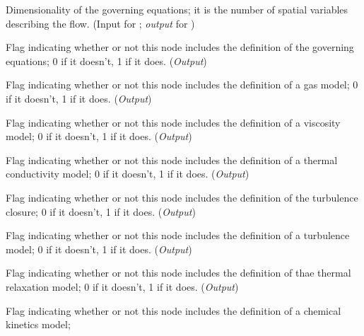 \begin{Ventryi}{}\raggedright
\item [\fort{EquationDimension}]
      Dimensionality of the governing equations; it is the number of
      spatial variables describing the flow.
      (\textcolor{input}{Input} for ;
      \textcolor{output}{\textit{output}} for )
\item [\fort{GoverningEquationsFlag}]
      Flag indicating whether or not this 
      node includes the definition of the governing equations;
      0 if it doesn't, 1 if it does.
      (\textcolor{output}{\textit{Output}})
\item [\fort{GasModelFlag}]
      Flag indicating whether or not this 
      node includes the definition of a gas model;
      0 if it doesn't, 1 if it does.
      (\textcolor{output}{\textit{Output}})
\item [\fort{ViscosityModelFlag}]
      Flag indicating whether or not this 
      node includes the definition of a viscosity model;
      0 if it doesn't, 1 if it does.
      (\textcolor{output}{\textit{Output}})
\item [\fort{ThermalConductModelFlag}]
      Flag indicating whether or not this 
      node includes the definition of a thermal conductivity model;
      0 if it doesn't, 1 if it does.
      (\textcolor{output}{\textit{Output}})
\item [\fort{TurbulenceClosureFlag}]
      Flag indicating whether or not this 
      node includes the definition of the turbulence closure;
      0 if it doesn't, 1 if it does.
      (\textcolor{output}{\textit{Output}})
\item [\fort{TurbulenceModelFlag}]
      Flag indicating whether or not this 
      node includes the definition of a turbulence model;
      0 if it doesn't, 1 if it does.
      (\textcolor{output}{\textit{Output}})
\item [\fort{ThermalRelaxationFlag}]
      Flag indicating whether or not this 
      node includes the definition of thae thermal relaxation model;
      0 if it doesn't, 1 if it does.
      (\textcolor{output}{\textit{Output}})
\item [\fort{ChemicalKineticsFlag}]
      Flag indicating whether or not this 
      node includes the definition of a chemical kinetics model;

\end{Ventryi}
